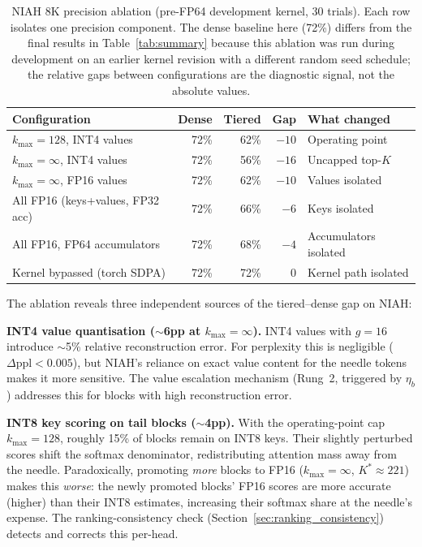 \documentclass[11pt,a4paper]{article}
\theoremstyle{definition}
\theoremstyle{remark}
\begin{document}
\begin{table}[H]
\centering
\caption{NIAH 8K precision ablation (pre-FP64 development kernel, 30 trials).  Each row isolates one precision component.  The dense baseline here (72\%) differs from the final results in Table~\ref{tab:summary} because this ablation was run during development on an earlier kernel revision with a different random seed schedule; the relative gaps between configurations are the diagnostic signal, not the absolute values.}
\label{tab:niah_ablation}
\small
\begin{tabular}{lrrrl}
\toprule
\textbf{Configuration} & \textbf{Dense} & \textbf{Tiered} & \textbf{Gap} & \textbf{What changed} \\
\midrule
$k_{\max}{=}128$, INT4 values & 72\% & 62\% & $-10$ & Operating point \\
$k_{\max}{=}\infty$, INT4 values & 72\% & 56\% & $-16$ & Uncapped top-$K$ \\
$k_{\max}{=}\infty$, FP16 values & 72\% & 62\% & $-10$ & Values isolated \\
All FP16 (keys+values, FP32 acc) & 72\% & 66\% & $-6$ & Keys isolated \\
All FP16, FP64 accumulators & 72\% & 68\% & $-4$ & Accumulators isolated \\
Kernel bypassed (torch SDPA) & 72\% & 72\% & $0$ & Kernel path isolated \\
\bottomrule
\end{tabular}
\end{table}

The ablation reveals three independent sources of the tiered--dense gap on NIAH:

\textbf{INT4 value quantisation ($\sim$6pp at $k_{\max}{=}\infty$).}  INT4 values with $g{=}16$ introduce $\sim$5\% relative reconstruction error.  For perplexity this is negligible ($\Delta\mathrm{ppl} < 0.005$), but NIAH's reliance on exact value content for the needle tokens makes it more sensitive.  The value escalation mechanism (Rung~2, triggered by $\eta_b$) addresses this for blocks with high reconstruction error.

\textbf{INT8 key scoring on tail blocks ($\sim$4pp).}  With the operating-point cap $k_{\max}{=}128$, roughly 15\% of blocks remain on INT8 keys.  Their slightly perturbed scores shift the softmax denominator, redistributing attention mass away from the needle.  Paradoxically, promoting \emph{more} blocks to FP16 ($k_{\max}{=}\infty$, $K^*{\approx}221$) makes this \emph{worse}: the newly promoted blocks' FP16 scores are more accurate (higher) than their INT8 estimates, increasing their softmax share at the needle's expense.  The ranking-consistency check (Section~\ref{sec:ranking_consistency}) detects and corrects this per-head.
\end{document}
